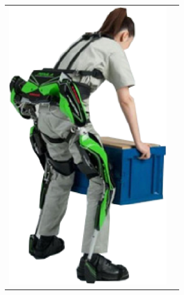 \documentclass[10pt,fleqn]{article} %
\begin{document}
\begin{multicols}{2}
\begin{tabular}{m{.6\linewidth}m{.3\linewidth}}
\includegraphics[width=\linewidth]{images/fig_02}

\end{tabular}



\begin{center}
\end{center}


\end{multicols}
\end{document}
